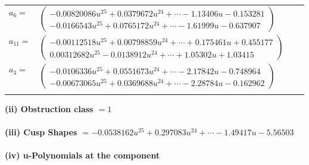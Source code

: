 \documentclass[1p]{elsarticle_modified}
\theoremstyle{definition}
\begin{document}
\begin{tabular}{m{7pt} m{180pt} m{7pt} m{180pt} }
\flushright $a_{6}=$&$\begin{pmatrix}-0.00820086 u^{25}+0.0379672 u^{24}+\cdots-1.13406 u-0.153281\\-0.0166543 u^{25}+0.0765172 u^{24}+\cdots-1.61999 u-0.637907\end{pmatrix}$ \\
\flushright $a_{11}=$&$\begin{pmatrix}-0.00112518 u^{25}+0.00798859 u^{24}+\cdots+0.175461 u+0.455177\\0.00312682 u^{25}-0.0138912 u^{24}+\cdots+1.05302 u+1.03415\end{pmatrix}$ \\
\flushright $a_{3}=$&$\begin{pmatrix}-0.0106336 u^{25}+0.0551673 u^{24}+\cdots-2.17842 u-0.748964\\-0.00673065 u^{25}+0.0369688 u^{24}+\cdots-2.28784 u-0.162962\end{pmatrix}$\\&\end{tabular}
\flushleft \textbf{(ii) Obstruction class $= 1$}\\~\\
\flushleft \textbf{(iii) Cusp Shapes $= -0.0538162 u^{25}+0.297083 u^{24}+\cdots-1.49417 u-5.56503$}\\~\\
\newpage\renewcommand{\arraystretch}{1}
\flushleft \textbf{(iv) u-Polynomials at the component}\newline \\
\end{document}
